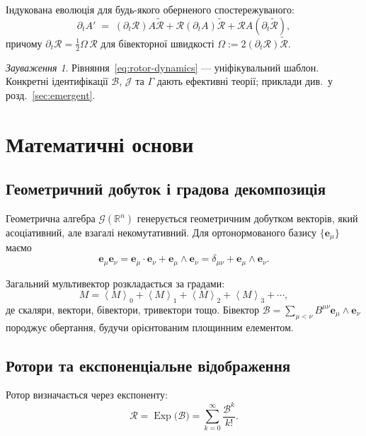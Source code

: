 \documentclass[11pt,a4paper]{article}
\newcommand{\e}{\mathbf{e}}
\newcommand{\R}{\mathbb{R}}
\newcommand{\grade}[2]{\left\langle #1 \right\rangle_{#2}}
\newcommand{\scal}[1]{\grade{#1}{0}}
\newcommand{\vecp}[1]{\grade{#1}{1}}
\newcommand{\biv}[1]{\grade{#1}{2}}
\newcommand{\triv}[1]{\grade{#1}{3}}
\newcommand{\rev}[1]{\widetilde{#1}}           %
\newcommand{\Exp}{\operatorname{Exp}}
\newcommand{\Rotor}{\mathcal{R}}
\newcommand{\Biv}{\mathcal{B}}
\theoremstyle{definition}
\theoremstyle{plain}
\theoremstyle{remark}
\newtheorem{remark}{Зауваження}
\begin{document}
Індукована еволюція для будь-якого оберненого спостережуваного:
\begin{equation}
  \partial_t A' \;=\; \left(\partial_t \Rotor\right) A \rev{\Rotor} + \Rotor \left(\partial_t A\right)\rev{\Rotor} + \Rotor A \left(\partial_t\rev{\Rotor}\right),
\end{equation}
причому $\partial_t \Rotor = \frac{1}{2}\Omega\,\Rotor$ для бівекторної швидкості $\Omega:=2(\partial_t \Rotor)\rev{\Rotor}$.

\begin{remark}
Рівняння~\eqref{eq:rotor-dynamics} — уніфікувальний шаблон. Конкретні ідентифікації $\Biv$, $\mathcal{J}$ та $\Gamma$ дають ефективні теорії; приклади див.~у розд.~\ref{sec:emergent}.
\end{remark}

\vspace{1em}

\section{Математичні основи}\label{sec:math}

\subsection{Геометричний добуток і градова декомпозиція}

Геометрична алгебра $\mathcal{G}(\R^n)$ генерується геометричним добутком векторів, який асоціативний, але взагалі некомутативний. Для ортонормованого базису $\{\e_\mu\}$ маємо
\begin{equation}
\e_\mu \e_\nu = \e_\mu \cdot \e_\nu + \e_\mu \wedge \e_\nu = \delta_{\mu\nu} + \e_\mu \wedge \e_\nu.
\end{equation}

Загальний мультивектор розкладається за градами:
\begin{equation}
M = \scal{M} + \vecp{M} + \biv{M} + \triv{M} + \cdots,
\end{equation}
де скаляри, вектори, бівектори, тривектори тощо. Бівектор $\Biv = \sum_{\mu<\nu} B^{\mu\nu} \e_\mu \wedge \e_\nu$ породжує обертання, будучи орієнтованим площинним елементом.

\subsection{Ротори та експоненціальне відображення}

Ротор визначається через експоненту:
\begin{equation}
\Rotor = \Exp\!\big(\Biv\big) = \sum_{k=0}^\infty \frac{\Biv^k}{k!}.
\end{equation}
\end{document}
